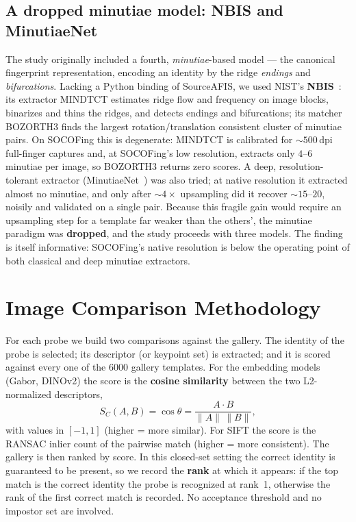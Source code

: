 \documentclass[11pt,a4paper]{article}
\begin{document}
\subsection{A dropped minutiae model: NBIS and MinutiaeNet}
The study originally included a fourth, \emph{minutiae}-based model --- the
canonical fingerprint representation, encoding an identity by the ridge
\emph{endings} and \emph{bifurcations}. Lacking a Python binding of SourceAFIS, we
used NIST's \textbf{NBIS}~\cite{nbis}: its extractor MINDTCT estimates ridge flow
and frequency on image blocks, binarizes and thins the ridges, and detects endings
and bifurcations; its matcher BOZORTH3 finds the largest rotation/translation
consistent cluster of minutiae pairs. On SOCOFing this is degenerate: MINDTCT is
calibrated for $\sim\!\num{500}$\,dpi full-finger captures and, at SOCOFing's low
resolution, extracts only $4$--$6$ minutiae per image, so BOZORTH3 returns zero
scores. A deep, resolution-tolerant extractor (MinutiaeNet~\cite{nguyen2018}) was
also tried; at native resolution it extracted almost no minutiae, and only after
$\sim\!4\times$ upsampling did it recover $\sim\!15$--$20$, noisily and validated
on a single pair. Because this fragile gain would require an upsampling step for a
template far weaker than the others', the minutiae paradigm was \textbf{dropped},
and the study proceeds with three models. The finding is itself informative:
SOCOFing's native resolution is below the operating point of both classical and
deep minutiae extractors.

\section{Image Comparison Methodology}
For each probe we build two comparisons against the gallery. The identity of the
probe is selected; its descriptor (or keypoint set) is extracted; and it is scored
against every one of the \num{6000} gallery templates. For the embedding models
(Gabor, DINOv2) the score is the \textbf{cosine similarity} between the two
L2-normalized descriptors,
\begin{equation}
S_C(A,B) = \cos\theta = \frac{A\cdot B}{\lVert A\rVert\,\lVert B\rVert},
\end{equation}
with values in $[-1,1]$ (higher = more similar). For SIFT the score is the RANSAC
inlier count of the pairwise match (higher = more consistent). The gallery is then
ranked by score. In this closed-set setting the correct identity is guaranteed to
be present, so we record the \textbf{rank} at which it appears: if the top match is
the correct identity the probe is recognized at rank~1, otherwise the rank of the
first correct match is recorded. No acceptance threshold and no impostor set are
involved.
\end{document}
